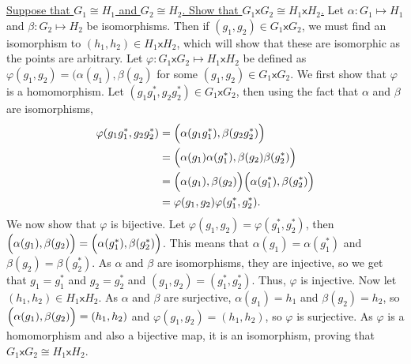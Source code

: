 \documentclass[10pt,a4paper]{report}
\begin{document}
\section{}
\underline{Suppose that $G_{1} \cong H_{1}$ and $G_{2} \cong H_{2}$. Show that $G_{1}\mathsf{x}G_{2} \cong H_{1}\mathsf{x}H_{2}$.}\newline
\indent Let $\alpha: G_{1}\mapsto H_{1}$ and $\beta: G_{2} \mapsto H_{2}$ be isomorphisms. Then if $(g_{1},g_{2})\in G_{1}\mathsf{x}G_{2}$, we must find an isomorphism to $(h_{1},h_{2})\in H_{1}\mathsf{x}H_{2}$, which will show that these are isomorphic as the points are arbitrary. Let $\varphi: G_{1}\mathsf{x}G_{2} \mapsto H_{1}\mathsf{x}H_{2}$ be defined as $\varphi(g_{1},g_{2})=(\alpha(g_{1}),\beta(g_{2})$ for some $(g_{1},g_{2})\in G_{1}\mathsf{x}G_{2}$. \newline
\indent We first show that $\varphi$ is a homomorphism. Let $(g_{1}g_{1}^{*},g_{2}g_{2}^{*})\in G_{1}\mathsf{x}G_{2}$, then using the fact that $\alpha$ and $\beta$ are isomorphisms,
\begin{align*}
	\varphi(g_{1}g_{1}^{*},g_{2}g_{2}^{*})&= \Bigl(\alpha(g_{1}g_{1}^{*}),\beta(g_{2}g_{2}^{*})\Bigr)\\
									&= \Bigl(\alpha(g_{1})\alpha(g_{1}^{*}),\beta(g_{2})\beta(g_{2}^{*})\Bigr)\\
									&= \Bigl(\alpha(g_{1}),\beta(g_{2})\Bigr)\Bigl(\alpha(g_{1}^{*}),\beta(g_{2}^{*})\Bigr) \\
									&= \varphi(g_{1},g_{2})\varphi(g_{1}^{*},g_{2}^{*}).
\end{align*}
\newline
\indent We now show that $\varphi$ is bijective. Let $\varphi(g_{1},g_{2})=\varphi(g_{1}^{*},g_{2}^{*})$, then $\Bigl(\alpha(g_{1}),\beta(g_{2})\Bigr)=\Bigl(\alpha(g_{1}^{*}),\beta(g_{2}^{*})\Bigr)$. This means that $\alpha(g_{1})=\alpha(g_{1}^{*})$ and $\beta(g_{2})=\beta(g_{2}^{*})$. As $\alpha$ and $\beta$ are isomorphisms, they are injective, so we get that $g_{1}=g_{1}^{*}$ and $g_{2}=g_{2}^{*}$ and $(g_{1},g_{2})=(g_{1}^{*},g_{2}^{*})$. Thus, $\varphi$ is injective. Now let $(h_{1},h_{2})\in H_{1}\mathsf{x}H_{2}$. As $\alpha$ and $\beta$ are surjective, $\alpha(g_{1})=h_{1}$ and $\beta(g_{2})=h_{2}$, so $\Bigl(\alpha(g_{1}),\beta(g_{2})\Bigr)=(h_{1},h_{2})$ and $\varphi(g_{1}, g_{2})=(h_{1},h_{2})$, so $\varphi$ is surjective. As $\varphi$ is a homomorphism and also a bijective map, it is an isomorphism, proving that $G_{1}\mathsf{x}G_{2} \cong H_{1}\mathsf{x}H_{2}$.
\end{document}
